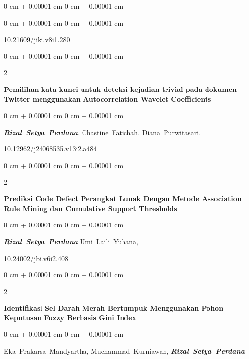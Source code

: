\documentclass[10pt, letterpaper]{article}
\newenvironment{onecolentry}{
    \begin{adjustwidth}{
        0 cm + 0.00001 cm
    }{
        0 cm + 0.00001 cm
    }
}{
    \end{adjustwidth}
} %
\newenvironment{twocolentry}[2][]{
    \onecolentry
    \def\secondColumn{#2}
    \setcolumnwidth{\fill, 4.5 cm}
    \begin{paracol}{2}
}{
    \switchcolumn \raggedleft \secondColumn
    \end{paracol}
    \endonecolentry
} %
\begin{document}
\begin{onecolentry}
\begin{samepage}
\begin{onecolentry}
                \href{https://doi.org/10.21609/jiki.v8i1.280}{10.21609/jiki.v8i1.280}
            \end{onecolentry}
        \end{samepage}
        \vspace{0.3 cm}
        \begin{samepage}
            \begin{twocolentry}{2015}
                \textbf{Pemilihan kata kunci untuk deteksi kejadian trivial pada dokumen Twitter menggunakan Autocorrelation Wavelet Coefficients}
            \end{twocolentry}
            \vspace{0.10 cm}
            \begin{onecolentry}
                 \mbox{\textbf{\textit{Rizal Setya Perdana}}},
                 \mbox{Chastine Fatichah},
                 \mbox{Diana Purwitasari},
                \vspace{0.10 cm}
                
                \href{http://dx.doi.org/10.12962/j24068535.v13i2.a484}{10.12962/j24068535.v13i2.a484}
            \end{onecolentry}
        \end{samepage}
        \vspace{0.3 cm}
        \begin{samepage}
            \begin{twocolentry}{2015}
                \textbf{Prediksi Code Defect Perangkat Lunak Dengan Metode Association Rule Mining dan Cumulative Support Thresholds}
            \end{twocolentry}
            \vspace{0.10 cm}
            \begin{onecolentry}
                \mbox{\textbf{\textit{Rizal Setya Perdana}}}
                 \mbox{Umi Laili Yuhana},
                 
                \vspace{0.10 cm}
                \href{https://doi.org/10.24002/jbi.v6i2.408}{10.24002/jbi.v6i2.408}
            \end{onecolentry}
        \end{samepage}
        \vspace{0.3 cm}
        \begin{samepage}
            \begin{twocolentry}{2015}
                \textbf{Identifikasi Sel Darah Merah Bertumpuk Menggunakan Pohon Keputusan Fuzzy Berbasis Gini Index}
            \end{twocolentry}
            \vspace{0.10 cm}
            \begin{onecolentry}
                 \mbox{Eka Prakarsa Mandyartha},
                 \mbox{Muchammad Kurniawan},
                 \mbox{\textbf{\textit{Rizal Setya Perdana}}}
                \vspace{0.10 cm}
                

\end{onecolentry}
\end{samepage}
\end{onecolentry}
\end{document}
